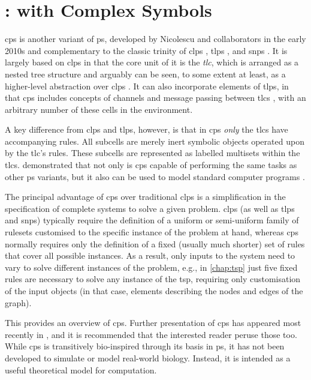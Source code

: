 \chapter{\label{chap:cpsystems}:  with Complex Symbols}

\gls{cps} is another variant of \gls{ps}, developed by Nicolescu and collaborators in the early 2010s \fxerror[inline]{[ref]} and complementary to the classic trinity of \gls{clps} \cite{Paun2000}, \gls{tlps} \cite{Martin-Vide2003}, and \gls{snps} \cite{Ionescu2006}.  It is largely based on \gls{clps} in that the core unit of it is the \emph{\gls{tlc}}, which is arranged as a nested tree structure and arguably can be seen, to some extent at least, as a higher-level abstraction over \gls{clps} \cite{Nicolescu2018}.  It can also incorporate elements of \gls{tlps}, in that \gls{cps} includes concepts of channels and message passing between \glspl{tlc} \cite{Henderson2019}, with an arbitrary number of these cells in the environment.  

A key difference from \gls{clps} and \gls{tlps}, however, is that in \gls{cps} \emph{only} the \glspl{tlc} have accompanying rules.  All subcells are merely inert symbolic objects operated upon by the \gls{tlc}'s rules.  These subcells are represented as labelled multisets within the \glspl{tlc}.  \citeauthor{Nicolescu2014a} demonstrated that not only is \gls{cps} capable of performing the same tasks as other \gls{ps} variants, but it also can be used to model standard computer programs \cite{Nicolescu2014a}.

The principal advantage of \gls{cps} over traditional \gls{clps} is a simplification in the specification of complete systems to solve a given problem.  \Gls{clps} (as well as \gls{tlps} and \gls{snps}) typically require the definition of a uniform or semi-uniform family of \glspl{ruleset} customised to the specific instance of the problem at hand, whereas \gls{cps} normally requires only the definition of a fixed (usually much shorter) set of rules that cover all possible instances. As a result, only inputs to the system need to vary to solve different instances of the problem, e.g., in \cref{chap:tsp} just five fixed rules are necessary to solve any instance of the \gls{tsp}, requiring only customisation of the input objects (in that case, elements describing the nodes and edges of the graph).

This  provides an overview of \gls{cps}.  Further presentation of \gls{cps} has appeared most recently in \cite{Nicolescu2018,Henderson2019,Henderson2020,Liu2020,Liu2021}, and it is recommended that the interested reader peruse those too.  While \gls{cps} is transitively bio-inspired through its basis in \gls{ps}, it has not been developed to simulate or model real-world biology.  Instead, it is intended as a useful theoretical model for computation.

